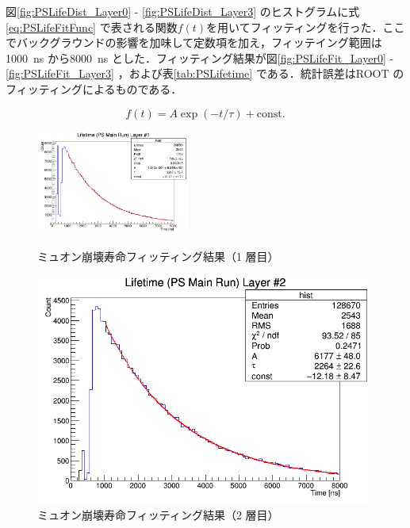 図\ref{fig:PSLifeDist_Layer0} - \ref{fig:PSLifeDist_Layer3} のヒストグラムに式\eqref{eq:PSLifeFitFunc} で表される関数$f(t)$を用いてフィッティングを行った．ここでバックグラウンドの影響を加味して定数項を加え，フィッテイング範囲は1000~ns から8000~ns とした．フィッティング結果が図\ref{fig:PSLifeFit_Layer0} - \ref{fig:PSLifeFit_Layer3} ，および表\ref{tab:PSLifetime} である．統計誤差はROOT のフィッティングによるものである．

\begin{equation}
f(t) = A \exp(-t / \tau) + \mathrm{const.}
\label{eq:PSLifeFitFunc}
\end{equation}

\begin{figure}[h]
	\centering
	\includegraphics[width = 0.45\textwidth]{figure/odagawa/PSLifetimeFit_Layer0.png}
	\caption{ミュオン崩壊寿命フィッティング結果（1 層目）}
	\label{fig:PSLifeFit_Layer0}
	\begin{minipage}{0.45\textwidth}
	\centering
	\includegraphics[width = \textwidth]{figure/odagawa/PSLifetimeFit_Layer1.png}
	\caption{ミュオン崩壊寿命フィッティング結果（2 層目）}
	\label{fig:PSLifeFit_Layer1}
	\end{minipage}
	\begin{minipage}{0.45\textwidth}
	\centering

\end{minipage}
\end{figure}

